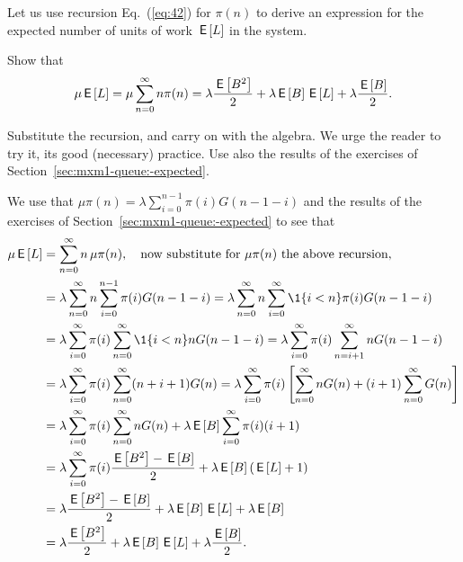 Let us use  recursion Eq.~(\ref{eq:42}) for $\pi(n)$ to
 derive an expression for the expected number of units of work $\,\mathsf{E}\left[L\right]$
 in the system.
\begin{exercise}[\faCalculator]
 Show that
\begin{equation}\label{eq:67}
  \mu \,\mathsf{E}\left[L\right] =\mu \sum_{n=0}^\infty n \pi(n) = \lambda \frac{\,\mathsf{E}\left[B^2\right]}2  + \lambda \,\mathsf{E}\left[B\right] \,\mathsf{E}\left[L\right] +\lambda \frac{\,\mathsf{E}\left[B\right]}2.
\end{equation}
\begin{hint}
Substitute the
  recursion, and carry on with the algebra. We urge the reader to try
  it, its good (necessary) practice.  Use also the results of the
  exercises of Section~\ref{sec:mxm1-queue:-expected}.  
\end{hint}
\begin{solution}
  We use that $\mu \pi(n) =\lambda \sum_{i=0}^{n-1} \pi(i) G(n-1-i)$
  and the results of the exercises of
  Section~\ref{sec:mxm1-queue:-expected} to see that
\begin{align*}
  \mu \E L
  &=\sum_{n=0}^\infty n\, \mu \pi(n), \quad \text{now substitute for $\mu \pi(n)$ the above recursion}, \\
& =\lambda \sum_{n=0}^\infty n \sum_{i=0}^{n-1} \pi(i) G(n-1-i) 
  =\lambda \sum_{n=0}^\infty n \sum_{i=0}^\infty \1{i<n} \pi(i) G(n-1-i) \\
& =\lambda \sum_{i=0}^\infty \pi(i) \sum_{n=0}^\infty \1{i<n} n G(n-1-i) 
  =\lambda \sum_{i=0}^\infty \pi(i) \sum_{n=i+1}^\infty n G(n-1-i) \\
& =\lambda \sum_{i=0}^\infty \pi(i) \sum_{n=0}^\infty (n+i+1) G(n) 
  =\lambda \sum_{i=0}^\infty \pi(i) \left[\sum_{n=0}^\infty n G(n) +(i+1) \sum_{n=0}^\infty G(n)\right]  \\
  &=\lambda \sum_{i=0}^\infty \pi(i)\sum_{n=0}^\infty n G(n) +\lambda  \E B \sum_{i=0}^\infty \pi(i) (i+1)  \\ 
  &=\lambda \sum_{i=0}^\infty \pi(i) \frac{\E{B^2} -\E B}2  + \lambda \E B (\E L +1)  \\ 
  &= \lambda \frac{\E{B^2} -\E B}2  + \lambda \E B \E L +\lambda \E B \\
  &= \lambda \frac{\E{B^2} }2  + \lambda \E B \E L +\lambda \frac{\E B}2.
\end{align*}
\end{solution}
\end{exercise}


